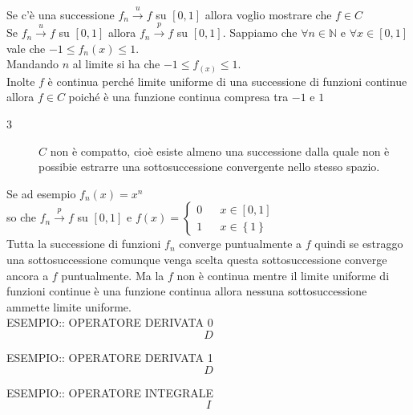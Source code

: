 Se c'è una successione $f_n\overset{u}{\to}f$ su $\left[0,1\right]$ allora voglio mostrare che $f\in C$\\
Se $f_n\overset{u}{\to}f$ su $\left[0,1\right]$ allora $f_n\overset{p}{\to}f$ su $\left[0,1\right]$.
Sappiamo che $\forall n\in\mathbb{N}$ e $\forall x\in \left[0,1\right]$ vale che $-1\le f_n(x)\le 1$.\\
Mandando $n$ al limite si ha che $-1\le f_(x)\le 1$.\\
Inolte $f$ è continua perché limite uniforme di una successione di funzioni continue allora $f\in C$ poiché è una funzione continua compresa tra $-1$ e $1$
\begin{description}
	\item[3] $C$ non è compatto, cioè esiste almeno una successione dalla quale non è possibie estrarre una sottosuccessione convergente nello stesso spazio.
\end{description}
Se ad esempio $f_n(x) = x^n$\\
so che $f_n\overset{p}{\to}f$ su $\left[0,1\right]$ e $f(x)=\left\{\begin{matrix}0&&x\in\left[0,1\right]\\1&&x\in\left\{1\right\}\end{matrix}\right.$\\
Tutta la successione di funzioni $f_n$ converge puntualmente a $f$ quindi se estraggo una sottosuccessione comunque venga scelta questa sottosuccessione converge ancora a $f$ puntualmente. Ma la $f$ non è continua mentre il limite uniforme di funzioni continue è una funzione continua allora nessuna sottosuccessione ammette limite uniforme.\\

ESEMPIO:: OPERATORE DERIVATA 0\\
$$D$$

ESEMPIO:: OPERATORE DERIVATA 1\\
$$D$$

ESEMPIO:: OPERATORE INTEGRALE\\
$$I$$

